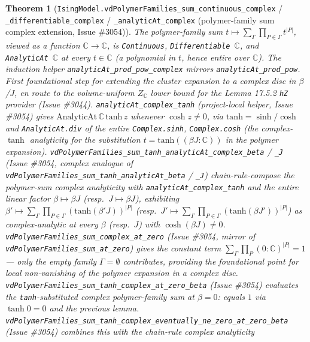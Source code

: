 \documentclass[a4paper,11pt]{article}
\newtheorem{theorem}{Theorem}
\begin{document}
\begin{theorem}[\texttt{IsingModel.vdPolymerFamilies\_sum\_continuous\_complex} /
\texttt{\_differentiable\_complex} / \texttt{\_analyticAt\_complex} (polymer-family sum
complex extension, Issue \#3054)]
The polymer-family sum
\(t\mapsto\sum_{\Gamma}\prod_{P\in\Gamma} t^{|P|}\), viewed as a function
\(\mathbb{C}\to\mathbb{C}\), is \texttt{Continuous}, \texttt{Differentiable}~\(\mathbb{C}\),
and \texttt{AnalyticAt}~\(\mathbb{C}\) at every \(t\in\mathbb{C}\) (a polynomial in \(t\),
hence entire over \(\mathbb{C}\)).  The induction helper
\texttt{analyticAt\_prod\_pow\_complex} mirrors \texttt{analyticAt\_prod\_pow}.
First foundational step for extending the cluster expansion to a complex disc in
\(\beta\)/\(J\), en route to the volume-uniform \(Z_{\mathbb{C}}\) lower bound for the
Lemma 17.5.2 \texttt{hZ} provider (Issue \#3044).
\texttt{analyticAt\_complex\_tanh} (project-local helper, Issue \#3054) gives
\(\mathrm{AnalyticAt}\,\mathbb{C}\,\mathrm{tanh}\,z\) whenever
\(\cosh z\ne0\), via \(\mathrm{tanh}=\sinh/\cosh\) and \texttt{AnalyticAt.div} of the entire
\texttt{Complex.sinh}, \texttt{Complex.cosh} (the complex-\(\tanh\) analyticity for the
substitution \(t=\mathrm{tanh}((\beta J:\mathbb{C}))\) in the polymer expansion).
\texttt{vdPolymerFamilies\_sum\_tanh\_analyticAt\_complex\_beta} / \texttt{\_J}
(Issue \#3054, complex analogue of
\texttt{vdPolymerFamilies\_sum\_tanh\_analyticAt\_beta} / \texttt{\_J}) chain-rule-compose
the polymer-sum complex analyticity with \texttt{analyticAt\_complex\_tanh} and the
entire linear factor \(\beta\mapsto\beta J\) (resp.\ \(J\mapsto\beta J\)), exhibiting
\(\beta'\mapsto\sum_{\Gamma}\prod_{P\in\Gamma}(\mathrm{tanh}(\beta'J))^{|P|}\)
(resp.\ \(J'\mapsto\sum_{\Gamma}\prod_{P\in\Gamma}(\mathrm{tanh}(\beta J'))^{|P|}\))
as complex-analytic at every \(\beta\) (resp.\ \(J\)) with
\(\cosh(\beta J)\ne0\).
\texttt{vdPolymerFamilies\_sum\_complex\_at\_zero} (Issue \#3054, mirror of
\texttt{vdPolymerFamilies\_sum\_at\_zero}) gives the constant term
\(\sum_\Gamma\prod_P(0:\mathbb{C})^{|P|}=1\) — only the empty family
\(\Gamma=\emptyset\) contributes, providing the foundational point for local
non-vanishing of the polymer expansion in a complex disc.
\texttt{vdPolymerFamilies\_sum\_tanh\_complex\_at\_zero\_beta} (Issue \#3054)
evaluates the \texttt{tanh}-substituted complex polymer-family sum at
\(\beta=0\): equals \(1\) via \(\tanh 0=0\) and the previous lemma.
\texttt{vdPolymerFamilies\_sum\_tanh\_complex\_eventually\_ne\_zero\_at\_zero\_beta}
(Issue \#3054) combines this with the chain-rule complex analyticity

\end{theorem}
\end{document}

